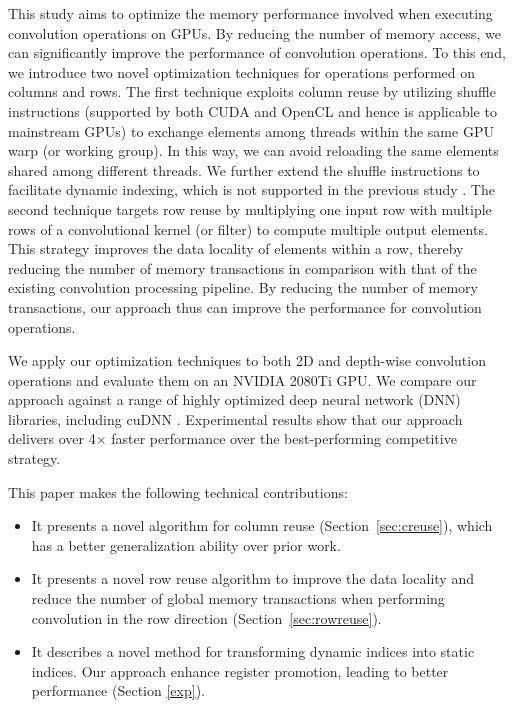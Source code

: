 This study aims to optimize the memory performance involved when executing convolution operations on GPUs. By reducing the number of memory
access, we can significantly improve the performance of convolution operations. To this end, we introduce two novel optimization techniques
for operations performed on columns and rows. The first technique exploits column reuse by utilizing shuffle instructions (supported by
both CUDA and OpenCL and hence is applicable to mainstream GPUs) to exchange elements among threads within the same GPU warp (or working
group). In this way, we can avoid reloading the same elements shared among different threads. We further extend the shuffle instructions to
facilitate dynamic indexing, which is not supported in the previous study \cite{vasilache2014fast}. The second technique targets row reuse
by multiplying one input row with multiple rows of a convolutional kernel (or filter) to compute multiple output elements. This strategy
improves the data locality of elements within a row, thereby reducing the number of memory transactions in comparison with that of the
existing convolution processing pipeline. By reducing the number of memory transactions, our approach thus can improve the performance for
convolution operations.

We apply our optimization techniques to both 2D and depth-wise convolution operations and evaluate them on an NVIDIA 2080Ti GPU. We compare
our approach against a range of highly optimized  deep neural network (DNN) libraries, including cuDNN \cite{ChetlurWVCTCS14}. Experimental
results show that our approach delivers over 4$\times$ faster performance over the best-performing competitive strategy.

This paper makes the following technical contributions:
\begin{itemize}
  \item It presents a novel algorithm for column reuse (Section~\ref{sec:creuse}), which has a better generalization
      ability over prior work.
  \item It presents a novel row reuse algorithm to improve the data locality and reduce the number of global memory transactions when
      performing convolution in the row direction (Section~\ref {sec:rowreuse}).
  \item It describes a novel method for transforming dynamic indices into static indices. Our approach enhance register promotion,
      leading to better performance (Section \ref{exp}).
\end{itemize}
